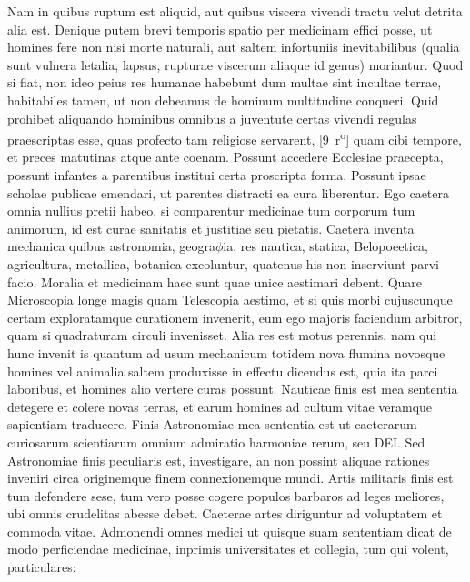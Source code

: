 Nam in quibus ruptum est aliquid, aut quibus viscera vivendi tractu velut detrita
alia est.
Denique putem brevi temporis spatio per medicinam effici posse, ut homines fere non nisi morte naturali, aut saltem infortuniis inevitabilibus (qualia sunt vulnera letalia, lapsus, rupturae viscerum aliaque id genus) moriantur.
Quod si fiat, non ideo peius res humanae habebunt dum multae sint incultae terrae, habitabiles tamen, ut non debeamus de hominum multitudine conqueri.
Quid prohibet aliquando hominibus omnibus a juventute certas vivendi regulas praescriptas esse, quas profecto tam religiose servarent,
%
[9~r\textsuperscript{o}]
%
quam cibi tempore, et preces matutinas atque ante coenam.
Possunt accedere Ecclesiae praecepta, possunt infantes a parentibus institui certa proscripta forma.
Possunt ipsae scholae publicae emendari, ut parentes distracti ea cura liberentur.
Ego caetera omnia nullius pretii habeo, si comparentur medicinae tum corporum tum animorum, id est curae sanitatis et justitiae seu pietatis.
Caetera inventa mechanica quibus astronomia, geogra$\phi$ia, res nautica, statica, Belopoeetica, agricultura, metallica, botanica excoluntur,
quatenus his non inserviunt parvi facio.
Moralia et medicinam haec sunt quae unice aestimari debent.
Quare Microscopia longe magis quam Telescopia aestimo,
et si quis morbi cujuscunque certam exploratamque curationem invenerit, eum ego majoris faciendum arbitror, quam si quadraturam circuli invenisset.
Alia res est motus perennis, nam qui hunc invenit is quantum ad usum mechanicum totidem nova flumina novosque homines vel animalia saltem produxisse in effectu dicendus est, quia ita parci laboribus, et homines alio vertere curas possunt.
Nauticae finis 
est mea sententia detegere et colere novas terras, et earum homines ad cultum vitae veramque sapientiam traducere.
Finis Astronomiae mea sententia est ut caeterarum curiosarum scientiarum omnium admiratio harmoniae rerum, seu DEI.
Sed Astronomiae finis peculiaris est, investigare, an non possint aliquae rationes inveniri circa originemque finem connexionemque mundi.
Artis militaris finis est tum defendere sese, tum vero posse cogere populos barbaros ad leges meliores, ubi omnis crudelitas abesse debet.
Caeterae artes diriguntur ad voluptatem et commoda vitae.
\pend%
\pstart%
Admonendi omnes medici ut quisque suam sententiam dicat de modo perficiendae medicinae, inprimis universitates et collegia, tum qui volent, particulares:
